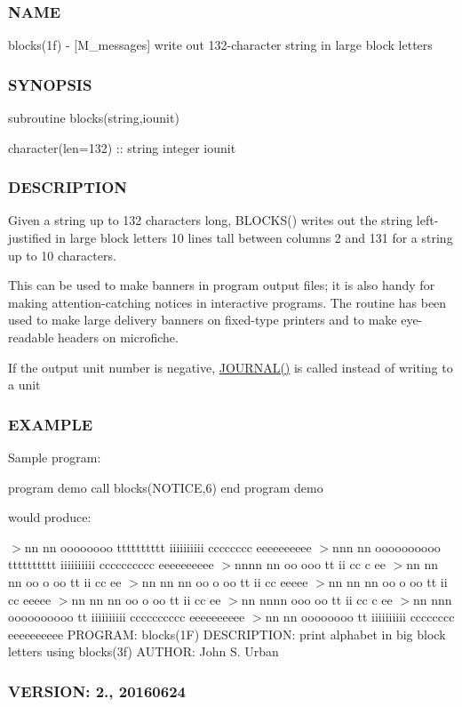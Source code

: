 \subsubsection*{N\+A\+ME}

blocks(1f) -\/ \mbox{[}M\+\_\+messages\mbox{]} write out 132-\/character string in large block letters 

\subsubsection*{S\+Y\+N\+O\+P\+S\+IS}

\begin{DoxyVerb}subroutine blocks(string,iounit)

 character(len=132)  ::  string
 integer iounit
\end{DoxyVerb}


\subsubsection*{D\+E\+S\+C\+R\+I\+P\+T\+I\+ON}

Given a string up to 132 characters long, B\+L\+O\+C\+K\+S() writes out the string left-\/justified in large block letters 10 lines tall between columns 2 and 131 for a string up to 10 characters.

This can be used to make banners in program output files; it is also handy for making attention-\/catching notices in interactive programs. The routine has been used to make large delivery banners on fixed-\/type printers and to make eye-\/readable headers on microfiche.

If the output unit number is negative, \hyperlink{M__journal_83_8txt_aee6db01e1c6132b5b3f146b5a0c6e7e1}{J\+O\+U\+R\+N\+A\+L()} is called instead of writing to a unit

\subsubsection*{E\+X\+A\+M\+P\+LE}

Sample program\+:

program demo call blocks(\textquotesingle{}N\+O\+T\+I\+CE\textquotesingle{},6) end program demo

would produce\+:

$>$nn nn oooooooo tttttttttt iiiiiiiiii cccccccc eeeeeeeeee $>$nnn nn oooooooooo tttttttttt iiiiiiiiii cccccccccc eeeeeeeeee $>$nnnn nn oo ooo tt ii cc c ee $>$nn nn nn oo o oo tt ii cc ee $>$nn nn nn oo o oo tt ii cc eeeee $>$nn nn nn oo o oo tt ii cc eeeee $>$nn nn nn oo o oo tt ii cc ee $>$nn nnnn ooo oo tt ii cc c ee $>$nn nnn oooooooooo tt iiiiiiiiii cccccccccc eeeeeeeeee $>$nn nn oooooooo tt iiiiiiiiii cccccccc eeeeeeeeee P\+R\+O\+G\+R\+AM\+: blocks(1\+F) D\+E\+S\+C\+R\+I\+P\+T\+I\+ON\+: print alphabet in big block letters using blocks(3f) A\+U\+T\+H\+OR\+: John S. Urban \subsubsection*{V\+E\+R\+S\+I\+ON\+: 2., 20160624}

